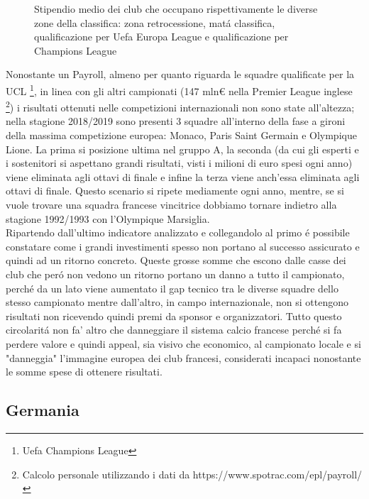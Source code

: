 \documentclass[
    corpo=11.5pt,
    oneside,
    evenboxes,
    tipotesi=triennale,
    stile=classica,
    oldstyle,
    autoretitolo,
    greek,
]{toptesi}
\begin{document}
\begin{interlinea}{1.5}
\begin{figure}
    \caption{Stipendio medio dei club che occupano rispettivamente le diverse zone della classifica: zona retrocessione, 
    mat\'a classifica, qualificazione per Uefa Europa League e qualificazione per Champions League}
    \label{stipendi_ligue1}
\end{figure}

Nonostante un Payroll, almeno per quanto riguarda le squadre qualificate per la UCL \footnote{Uefa Champions League}, in linea con gli
altri campionati (147 mln€ nella Premier League inglese \footnote{Calcolo personale utilizzando i dati da https://www.spotrac.com/epl/payroll/})
i risultati ottenuti nelle competizioni internazionali non sono state all'altezza; nella stagione 2018/2019 sono presenti 3 squadre 
all'interno della fase a gironi della massima competizione europea: Monaco, Paris Saint Germain e Olympique Lione. La prima si 
posizione ultima nel gruppo A, la seconda (da cui gli esperti e i sostenitori si aspettano grandi risultati, visti i milioni di euro 
spesi ogni anno) viene eliminata agli ottavi di finale e infine la terza viene anch'essa eliminata agli ottavi di finale. Questo scenario
si ripete mediamente ogni anno, mentre, se si vuole trovare una squadra francese vincitrice dobbiamo tornare indietro alla stagione 1992/1993
con l'Olympique Marsiglia.\\
Ripartendo dall'ultimo indicatore analizzato e collegandolo al primo \'e possibile constatare come i grandi investimenti spesso non portano 
al successo assicurato e quindi ad un ritorno concreto. Queste grosse somme che escono dalle casse dei club che per\'o
non vedono un ritorno portano un danno a tutto il campionato, perch\'e da un lato viene aumentato il gap tecnico tra le diverse squadre dello
stesso campionato mentre dall'altro, in campo internazionale, non si ottengono risultati non ricevendo quindi premi da sponsor e organizzatori.
Tutto questo circolarit\'a non fa' altro che danneggiare il sistema calcio francese perch\'e si fa perdere valore e quindi appeal, sia 
visivo che economico, al campionato locale e si "danneggia" l'immagine europea dei club francesi, considerati incapaci nonostante le somme spese
di ottenere risultati.

\subsection{Germania}
\end{interlinea}
\end{document}
